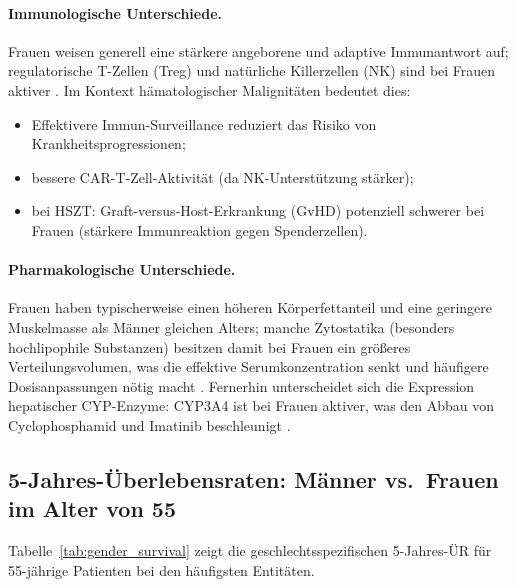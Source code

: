 ﻿\documentclass[12pt,a4paper]{article}
\theoremstyle{definition}
\begin{document}
\paragraph{Immunologische Unterschiede.}
Frauen weisen generell eine stärkere angeborene und adaptive Immunantwort auf;
regulatorische T-Zellen (Treg) und natürliche Killerzellen (NK) sind bei Frauen
aktiver \cite{frey2010}. Im Kontext hämatologischer Malignitäten bedeutet dies:
\begin{itemize}
  \item Effektivere Immun-Surveillance reduziert das Risiko von Krankheitsprogressionen;
  \item bessere CAR-T-Zell-Aktivität (da NK-Unterstützung stärker);
  \item bei HSZT: Graft-versus-Host-Erkrankung (GvHD) potenziell schwerer bei
        Frauen (stärkere Immunreaktion gegen Spenderzellen).
\end{itemize}

\paragraph{Pharmakologische Unterschiede.}
Frauen haben typischerweise einen höheren Körperfettanteil und eine geringere
Muskelmasse als Männer gleichen Alters; manche Zytostatika (besonders
hochlipophile Substanzen) besitzen damit bei Frauen ein größeres
Verteilungsvolumen, was die effektive Serumkonzentration senkt und
häufigere Dosisanpassungen nötig macht \cite{frey2010}. Fernerhin unterscheidet
sich die Expression hepatischer CYP-Enzyme: CYP3A4 ist bei Frauen aktiver, was
den Abbau von Cyclophosphamid und Imatinib beschleunigt \cite{mccabe2015}.

\subsection{5-Jahres-Überlebensraten: Männer vs.\ Frauen im Alter von 55}

Tabelle~\ref{tab:gender_survival} zeigt die geschlechtsspezifischen 5-Jahres-ÜR
für 55-jährige Patienten bei den häufigsten Entitäten.
\end{document}

